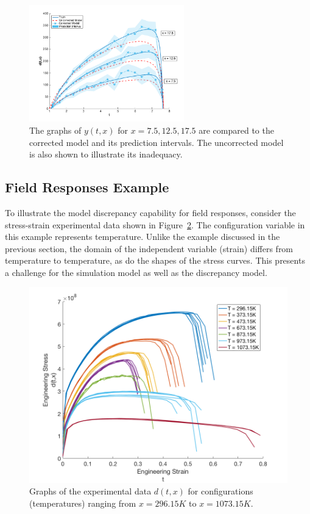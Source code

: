\begin{figure}
\begin{center}
\includegraphics[width=0.6\textwidth]{images/moddiscrep_correctedlowmidhigh.png}
\end{center}
\vspace{-0.5cm}
\caption{The graphs of $y(t,x)$ for $x = 7.5, 12.5, 17.5$ are compared to the corrected model and its prediction intervals. The uncorrected model is also shown to illustrate its inadequacy.}
\label{fig:md_pred}
\end{figure}

\subsection{Field Responses Example}

To illustrate the model discrepancy capability for field responses, consider
the stress-strain experimental data shown in Figure~\ref{fig:mat_exp}. The 
configuration variable in this example represents temperature. Unlike the
example discussed in the previous section, the domain of the independent 
variable (strain) differs from temperature to temperature, as do the shapes
of the stress curves. This presents a challenge for the simulation model as 
well as the discrepancy model.
 
\begin{figure}[t]
\begin{center}
\includegraphics[width=.6\textwidth]{images/moddiscrep_ExpAllData.png}
\end{center}
\vspace{-0.5cm}
\caption{Graphs of the experimental data $d(t,x)$ for configurations 
(temperatures) ranging from $x = 296.15K$ to $x = 1073.15K$.}
\label{fig:mat_exp}
\end{figure}

